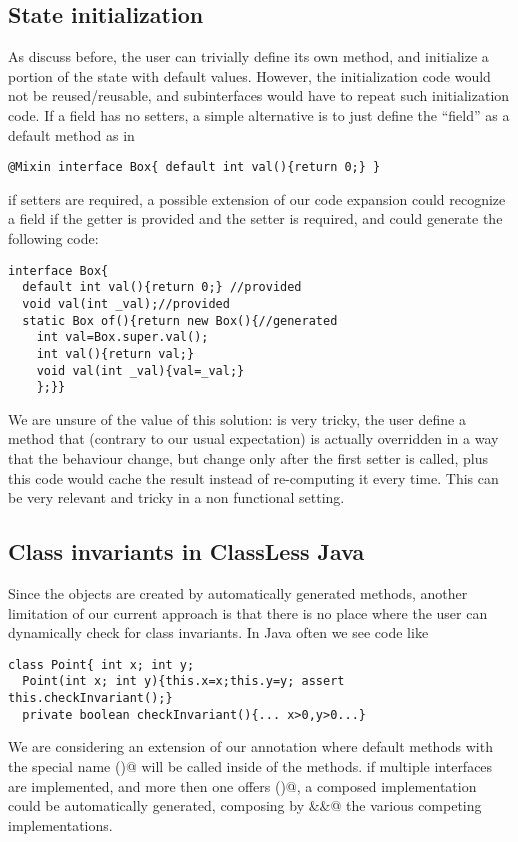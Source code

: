 \subsection{State initialization}

As discuss before, the user can trivially define its own \Q@of@ method, and initialize a portion of the state with default values.
However, the initialization code would not be reused/reusable, and subinterfaces would have to repeat such initialization code.
If a field has no setters, a simple alternative is to just define the ``field'' as a default method as in 
\begin{lstlisting}
@Mixin interface Box{ default int val(){return 0;} }
\end{lstlisting}
if setters are required, a possible extension of our code expansion could recognize a field if the getter is provided and the setter is required, and could generate the following code:
\begin{lstlisting}
interface Box{ 
  default int val(){return 0;} //provided
  void val(int _val);//provided
  static Box of(){return new Box(){//generated
    int val=Box.super.val();
    int val(){return val;}
    void val(int _val){val=_val;}
    };}}
\end{lstlisting}
We are unsure of the value of this solution: is very tricky, the user define a method that (contrary to our usual expectation) is actually overridden in a way that the behaviour change, but change only after the first setter is called, plus this code would cache the result instead of re-computing it every time. This can be very relevant and tricky in a non functional setting.

\subsection{Class invariants in ClassLess Java}
Since the objects are created by automatically generated methods,
another limitation of our current approach is that there is no place where the user can dynamically check for class invariants.
In Java often we see code like
\begin{lstlisting}
class Point{ int x; int y;
  Point(int x; int y){this.x=x;this.y=y; assert this.checkInvariant();}
  private boolean checkInvariant(){... x>0,y>0...}
\end{lstlisting} 

We are considering an extension of our annotation where 
default methods with the special name \Q@checkInvariant()@ will be called inside of the \Q@of@ methods.
if multiple interfaces are implemented, and more then one offers
\Q@checkInvariant()@,  a composed implementation could be automatically generated, composing by \Q@&&@ the various competing implementations.

